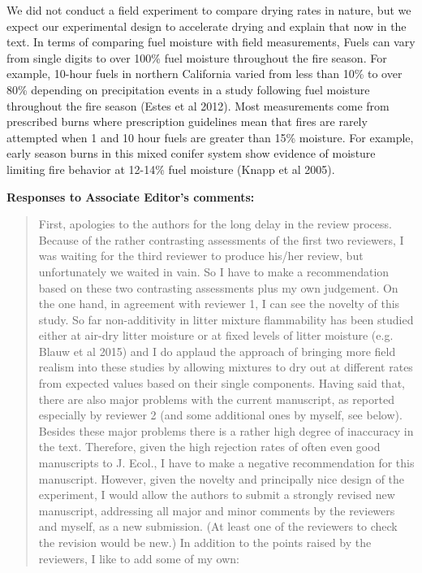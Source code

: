 \documentclass[letterpaper, 12pt]{letter}
\begin{document}
\begin{letter}{}
We did not conduct a field experiment to compare drying rates in nature, but we
expect our experimental design to accelerate drying and explain that now in the
text. In terms of comparing fuel moisture with field measurements, Fuels can
vary from single digits to over 100\% fuel moisture throughout the fire season.
For example, 10-hour fuels in northern California varied from less than 10\% to
over 80\% depending on precipitation events in a study following fuel moisture
throughout the fire season (Estes et al 2012). Most measurements come from
prescribed burns where prescription guidelines mean that fires are rarely
attempted when 1 and 10 hour fuels are greater than 15\% moisture. For example,
early season burns in this mixed conifer system show evidence of moisture
limiting fire behavior at 12-14\% fuel moisture (Knapp et al 2005).

{\bf Responses to Associate Editor's comments:}

\begin{quote}
First, apologies to the authors for the long delay in the review process. Because of the rather contrasting assessments of the first two reviewers, I was waiting for the third reviewer to produce his/her review, but unfortunately we waited in vain. So I have to make a recommendation based on these two contrasting assessments plus my own judgement. On the one hand, in agreement with reviewer 1, I can see the novelty of this study. So far non-additivity in litter mixture flammability has been studied either at air-dry litter moisture or at fixed levels of litter moisture (e.g. Blauw et al 2015) and I do applaud the approach of bringing more field realism into these studies by allowing mixtures to dry out at different rates from expected values based on their single components. Having said that, there are also major problems with the current manuscript, as reported especially by reviewer 2 (and some additional ones by myself, see below). Besides these major problems there is a rather high degree of inaccuracy in the text.  Therefore, given the high rejection rates of often even good manuscripts to J. Ecol., I have to make a negative recommendation for this manuscript. However, given the novelty and principally nice design of the experiment, I would allow the authors to submit a strongly revised new manuscript, addressing all major and minor comments by the reviewers and myself, as a new submission. (At least one of the reviewers to check the revision would be new.) In addition to the points raised by the reviewers, I like to add some of my own:
\end{quote}


\end{letter}
\end{document}

